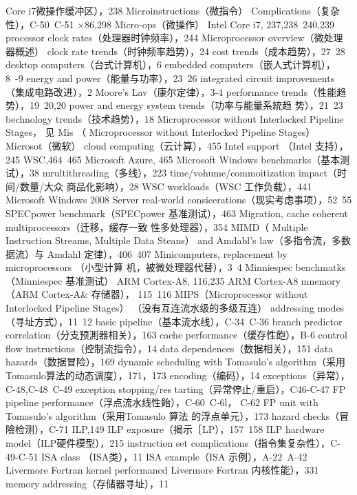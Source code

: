 Core i7微操作缓冲区），238
Microinstructions（微指令）
Complications（复杂性），C-50~C-51
×86,298
Micro-ops（微操作）
Intel Core i7, 237,238~240,239
processor clock rates（处理器时钟频率），244
Microprocessor overview（微处理器概述）
clock rate trends（时钟频率趋势），24
cost trends（成本趋势），27~28
desktop computers（台式计算机），6
embedded computers（嵌人式计算机），8~-9
energy and power（能量与功率），23~26
integrated circuit improvements（集成电路改进），2
Moore's Lav（康尔定律），3-4
performance trends（性能趋势），19~20,20
power and energy system trends（功率与能量系統趋
势），21~23
bechnology trends（技术趋势），18
Microprocessor without Interlocked Pipeline Stages， 见 Mis
（ Microprocessor without Interlocked Pipeline Stages）
Microsot（微软）
cloud computing（云计算），455
Intel support （Intel 支持），245
WSC,464~465
Microsoft Azure, 465
Microsoft Windows
benchmarks（基本测试），38
mrultithreading（多线），223
time/vohume/commoitization impact（时间/数量/大众
商品化影响），28
WSC workloads（WSC 工作负载），441
Microsoft Windows 2008 Server
real-world consicerations（现实考虑事项），52~55
SPECpower benchmark（SPECpower 基准测试），463
Migration, cache coherent multiprocessors（迁移，缓存一致
性多处理器），354
MIMD（ Multiple Instruction Streams, Multiple Data Steans）
and Amdabl's law（多指令流，多数据流）与 Amdahl
定律），406~407
Minicomputers, replacement by microprocessors （小型计算
机，被微处理器代替），3~4
Minniespec benchmatks（Minniespec 基准测试）
ARM Cortex-A8, 116,235
ARM Cortex-A8 mnemory （ARM Cortex-A& 存储器），
115~116
MIPS（Microprocessor without Interlocked Pipeline Stages）
（没有互连流水级的多级互连）
addressing modes（寻址方式），11~12
basic pipeline（基本流水线），C-34~C-36
branch predictor correlation（分支预測器相关），163
cache performance（缓存性飽），B-6
control flow instructions（控制流指令），14
data dependences（数据相关），151
data hazards（数据冒险），169
dynamic scheduling with Tomasulo's algorithm（采用
Tomasulo算法的动态调度），171，173
encoding（编码），14
exceptions（异常），C-48,C-48~C-49
exception stopping/res tarting（异常停止/重启），C46-C-47
FP pipeline performance（浮点流水线性飴），C-60~C-6l，
C-62
FP unit with Tomasulo's algorithm（采用Tomasulo 算法
的浮点单元），173
hazard checks（冒險检测），C-71
ILP,149
ILP exposure（揭示［LP），157~158
ILP hardware model（ILP硬件模型），215
instruction set complications（指令集复杂性），C-49-C-51
ISA class （ISA类），11
ISA example（ISA 示例），A-22~A-42
Livermore Fortran kernel performancd Livermore Fortran
内核性能），331
memory addressing（存储器寻址），11
